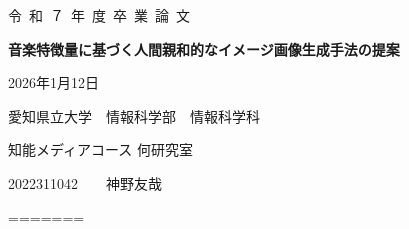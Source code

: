 \documentclass[12pt]{jarticle}
\begin{document}
\thispagestyle{empty}
\begin{center}
{令~和~７~年~度~卒~業~論~文}
\vspace*{3.5cm}

{\LARGE\bf 音楽特徴量に基づく人間親和的なイメージ画像生成手法の提案} %
\vspace*{2cm}

{\large 2026年1月12日}  %
\vspace*{2cm}

{\large 愛知県立大学~~情報科学部~~情報科学科}
\vspace*{1cm}

{\Large 知能メディアコース 何研究室}
\vspace*{1cm}

{\large 2022311042~~~~神野友哉}%
\vspace*{3mm}
\end{center}
=======
\usepackage{graphicx}
\end{document}
